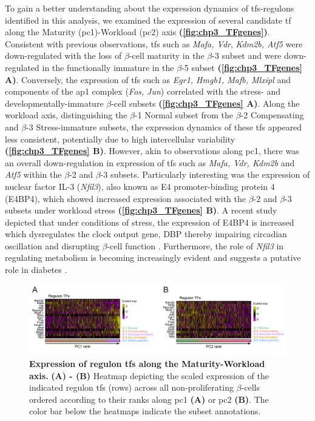 \par To gain a better understanding about the expression dynamics of \glspl{tf}-regulons identified in this analysis, we examined the expression of several candidate \gls{tf} along the Maturity (\gls{pc}1)-Workload (\gls{pc}2) axis \textbf{(\autoref{fig:chp3_TFgenes})}. 
Consistent with previous observations, \glspl{tf} such as \textit{Mafa, Vdr}, \textit{Kdm2b, Atf5} were down-regulated with the loss of $\beta$-cell maturity in the $\beta$-3 subset and were down-regulated in the functionally immature in the $\beta$-5 subset \textbf{(\autoref{fig:chp3_TFgenes} A)}. Conversely, the expression of \glspl{tf} such as \textit{Egr1, Hmgb1, Mafb, Mlxipl} and components of the \gls{ap1} complex (\textit{Fos, Jun}) correlated with the stress- and  developmentally-immature $\beta$-cell subsets \textbf{(\autoref{fig:chp3_TFgenes} A)}. Along the workload axis, distinguishing the $\beta$-1 Normal subset from the $\beta$-2 Compensating and $\beta$-3 Stress-immature subsets, the expression dynamics of these \glspl{tf} appeared less consistent, potentially due to high intercellular variability \textbf{(\autoref{fig:chp3_TFgenes} B)}. However, akin to observations along \gls{pc}1, there was an overall down-regulation in expression of \glspl{tf} such as \textit{Mafa, Vdr, Kdm2b} and \textit{Atf5} within the $\beta$-2 and $\beta$-3 subsets. Particularly interesting was the expression of nuclear factor IL-3 (\textit{Nfil3}), also known as E4 promoter-binding protein 4 (E4BP4), which showed increased expression associated with the $\beta$-2 and $\beta$-3 subsets under workload stress \textbf{(\autoref{fig:chp3_TFgenes} B)}. A recent study depicted that under conditions of  stress, the expression of E4BP4 is increased which dysregulates the clock output gene, DBP thereby impairing circadian oscillation and disrupting $\beta$-cell function \textbf{\cite{ohta_clock_2017}}. Furthermore, the role of \textit{Nfil3} in regulating metabolism is becoming increasingly evident and suggests a putative role in diabetes \textbf{\cite{keniry_new_nodate}}.\\

\begin{figure}
    \centering
    \includegraphics[width=\linewidth]{Chapter5/Fig/F3-19-01.png}
    \caption[Expression of regulon along the Maturity-Workload axis]{\textbf{Expression of regulon \glspl{tf} along the Maturity-Workload axis.} \textbf{(A) - (B)} Heatmap depicting the scaled expression of the indicated regulon \glspl{tf} (rows) across all non-proliferating $\beta$-cells ordered according to their ranks along \gls{pc}1 \textbf{(A)} or \gls{pc}2 \textbf{(B)}. The color bar below the heatmaps indicate the subset annotations. }
    \label{fig:chp3_TFgenes}
\end{figure}

